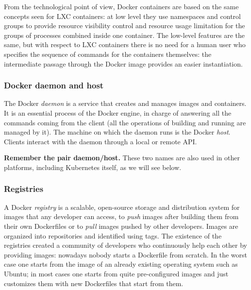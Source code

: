 From the technological point of view, Docker containers are based on the same concepts seen for LXC containers: at low level they use namespaces and control groups to provide resource visibility control and resource usage limitation for the groups of processes combined inside one container. The low-level features are the same, but with respect to LXC containers there is no need for a human user who specifies the sequence of commands for the containers themselves: the intermediate passage through the Docker image provides an easier instantiation.

\subsubsection*{Docker daemon and host}

The Docker \emph{daemon} is a service that creates and manages images and containers. It is an essential process of the Docker engine, in charge of answering all the commands coming from the client (all the operations of building and running are managed by it). The machine on which the daemon runs is the Docker \emph{host}. Clients interact with the daemon through a local or remote API.

\begin{notebox}
	\textbf{Remember the pair daemon/host.} These two names are also used in other platforms, including Kubernetes itself, as we will see below.
\end{notebox}

\subsubsection*{Registries}

A Docker \emph{registry} is a scalable, open-source storage and distribution system for images that any developer can access, to \emph{push} images after building them from their own Dockerfiles or to \emph{pull} images pushed by other developers. Images are organized into repositories and identified using tags. The existence of the registries created a community of developers who continuously help each other by providing images: nowadays nobody starts a Dockerfile from scratch. In the worst case one starts from the image of an already existing operating system such as Ubuntu; in most cases one starts from quite pre-configured images and just customizes them with new Dockerfiles that start from them.


